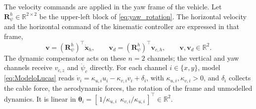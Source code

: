 The velocity commands are applied in the yaw frame of the vehicle. Let
$\mathbf{R}_\psi^{h}\in\mathbb{R}^{2\times2}$ be the upper-left block of \eqref{eq:yaw_rotation}. The
horizontal velocity and the horizontal command of the kinematic controller are expressed in that frame,
\begin{equation}\label{eq:yaw_frame}
\mathbf{v} = (\mathbf{R}_\psi^{h})^{\top}\dot{\mathbf{x}}_h,\qquad
\mathbf{v}_d = (\mathbf{R}_\psi^{h})^{\top}\mathbf{v}_{c,h},\qquad \mathbf{v},\mathbf{v}_d\in\mathbb{R}^{2}.
\end{equation}
The dynamic compensator acts on these $n=2$ channels; the vertical and yaw channels receive
$v_{c,z}$ and $\dot\psi_c$ directly. For each channel $i\in\{x,y\}$, model \eqref{eq:ModeloLucas} reads
$\dot v_i=\kappa_{u,i}u_i-\kappa_{v,i}v_i+\delta_i$, with $\kappa_{u,i},\kappa_{v,i}>0$, and $\delta_i$
collects the cable force, the aerodynamic forces, the rotation of the frame and unmodelled dynamics.
It is linear in $\boldsymbol{\theta}_i=[\,1/\kappa_{u,i}\ \ \kappa_{v,i}/\kappa_{u,i}\,]^{\top}\in\mathbb{R}^2$.

